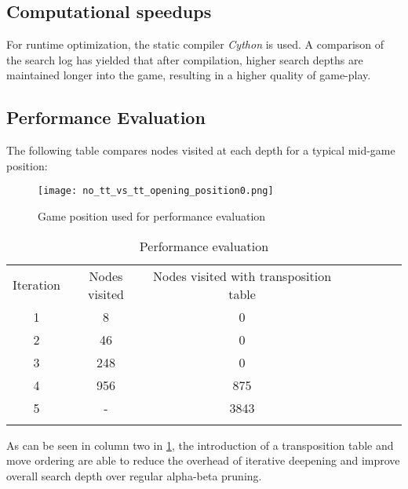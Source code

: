 \subsection{Computational speedups}
For runtime optimization, the static compiler \textit{Cython} is used. A comparison of the search log has yielded that after compilation, higher search depths are maintained longer into the game, resulting in a higher quality of game-play.

\subsection{Performance Evaluation}
The following table compares nodes visited at each depth for a typical mid-game position:

\begin{figure}[h]
    \centering
    \texttt{[image: no\_tt\_vs\_tt\_opening\_position0.png]}
    \caption{Game position used for performance evaluation}
    \label{fig:performance_evaluation}
\end{figure}  

\begin{table}[H]
    \centering
    \begin{tabular}{ccclllll}
    \cline{1-3}
    \multicolumn{1}{|c|}{Iteration} & \multicolumn{1}{|c|}{Nodes visited} & \multicolumn{1}{|c|}{Nodes visited with transposition table}\\ \cline{1-3}
    \multicolumn{1}{|c|}{1} & \multicolumn{1}{|c|}{8} & \multicolumn{1}{|c|}{0}\\ \cline{1-3}
    \multicolumn{1}{|c|}{2} & \multicolumn{1}{|c|}{46} & \multicolumn{1}{|c|}{0}\\ \cline{1-3}
    \multicolumn{1}{|c|}{3} & \multicolumn{1}{|c|}{248} & \multicolumn{1}{|c|}{0}\\ \cline{1-3}
    \multicolumn{1}{|c|}{4} & \multicolumn{1}{|c|}{956} & \multicolumn{1}{|c|}{875}\\ \cline{1-3}
    \multicolumn{1}{|c|}{5} & \multicolumn{1}{|c|}{-} & \multicolumn{1}{|c|}{3843}\\ \cline{1-3}
    \multicolumn{1}{l}{}   & \multicolumn{1}{l}{}
    \end{tabular}
    \caption{Performance evaluation}
    \label{tbl:performance_evaluation}
\end{table}

As can be seen in column two in \ref{tbl:performance_evaluation}, the introduction of a transposition table and move ordering are able to reduce the overhead of iterative deepening and improve overall search depth over regular alpha-beta pruning.